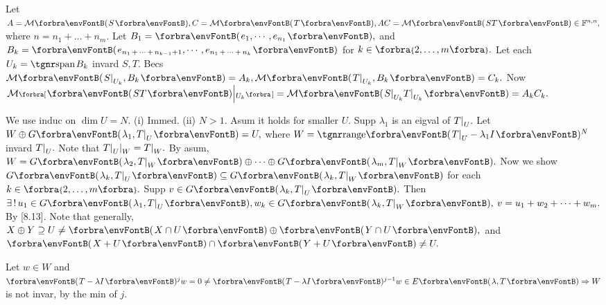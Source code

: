Let $A=\Mt{S},C=\Mt{T},AC=\Mt{ST}\in\Fbb^{n,n},$ where $n=n_1+\dots+n_m.$\parSol{}
Let $B_1=\Par{e_1,\cdots,e_{n_1}},$ and $B_{k}=\Par{e_{n_1\,+\,\cdots\,+\,n_{k-1}+1},\cdots,e_{n_1\,+\,\cdots\,+\,n_k}}$ for $k\in\Bra{2,\dots,m}.$\vspace{2pt}\parSol{}
Let each $U_k=\spn B_k$ invard $S,T.$ Becs $\Mt{S\mmid_{U_k},B_k}=A_k,\Mt{T\mmid_{U_k},B_k}=C_k.$\vspace{2pt}\parSol{}
Now $\Mt[\Sbra]{\Par{ST}\Big|{_{U_k}}}=\Mt{S\mmid_{U_k}T\mmid_{U_k}}=A_kC_k.$\PfEnd
\SepLine

We use induc on $\dim U=N.$ (i) Immed. (ii) $N>1.$ Asum it holds for smaller $U.$\parSol{}
Supp $\lambda_1$ is an eigval of $T\text{\normalsize|}_U.$ Let $W\oplus G\Par{\lambda_1,T\mmid_U}=U,$ where $W=\Range\Par{T\mmid_U-\lambda_1I}{^N}$ invard $T\text{\normalsize|}_U.$\parSol{}
Note that $T\text{\normalsize|}_U\text{\normalsize|}_W=T\text{\normalsize|}_W.$ By asum, $W=G\Par{\lambda_2,T\mmid_W}\oplus\cdots\oplus G\Par{\lambda_m,T\mmid_W}.$\parSol{}
Now we show $G\Par{\lambda_k,T\mmid_U}\subseteq G\Par{\lambda_k,T\mmid_W}$ for each $k\in\Bra{2,\dots,m}.$ Supp $v\in G\Par{\lambda_k,T\mmid_U}.$\parSol{}
Then $\exists\,!\,u_1\in G\Par{\lambda_1,T\mmid_U},w_k\in G\Par{\lambda_k,T\mmid_W},\:v=u_1+w_2+\dots+w_m.$ By [8.13].\PfEnd\vspace{2pt}
\AComm Note that generally, $X\oplus Y\supseteq U\neq\Par{X\cap U}\oplus\Par{Y\cap U},$ and $\Par{X+U}\cap\Par{Y+U}\neq U.$
\SepLine

Let $w\in W$ and $\Par{T-\lambda I}{^j}w=0\neq\Par{T-\lambda I}{^{j-1}}w\in E\Par{\lambda,T}\Rightarrow W$ is not invar, by the min of $j.$\PfEnd
\SepLine

\SepLine\pagebreak

